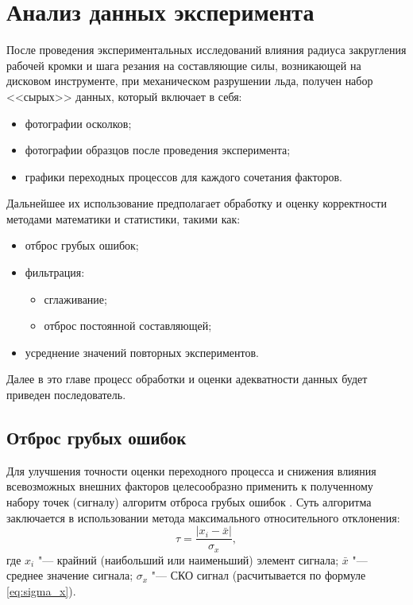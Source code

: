 \chapter{Анализ данных эксперимента}\label{chapt:data_analysis}

После проведения экспериментальных исследований влияния радиуса закругления рабочей кромки и шага резания на составляющие силы, возникающей на дисковом инструменте, при механическом разрушении льда, получен набор <<сырых>> данных, который включает в себя:
\begin{itemize}
	\item фотографии осколков;
	\item фотографии образцов после проведения эксперимента;
	\item графики переходных процессов для каждого сочетания факторов.
\end{itemize}

Дальнейшее их использование предполагает обработку и оценку корректности методами математики и статистики, такими как:
\begin{itemize}
	\item отброс грубых ошибок;
	\item фильтрация:
	\begin{itemize}
		\item сглаживание;
		\item отброс постоянной составляющей;
	\end{itemize}		
	\item усреднение значений повторных экспериментов.		
\end{itemize}

Далее в это главе процесс обработки и оценки адекватности данных будет приведен последователь.

\section{Отброс грубых ошибок}\label{sect:drop_gross_error}

Для улучшения точности оценки переходного процесса и снижения влияния всевозможных внешних факторов целесообразно применить к полученному набору точек (сигналу) алгоритм отброса грубых ошибок \cite{LvovStat}. Суть алгоритма заключается в использовании метода максимального относительного отклонения:
\begin{equation}\label{eq:MOO}
\tau=\frac{|x_i-\bar{x}|}{\sigma_x},
\end{equation} 
где $ x_i $ "--- крайний (наибольший или наименьший) элемент сигнала; $ \bar{x} $ "--- среднее значение сигнала; $ \sigma_x $ "--- СКО сигнал (расчитывается по формуле \ref{eq:sigma_x}).

